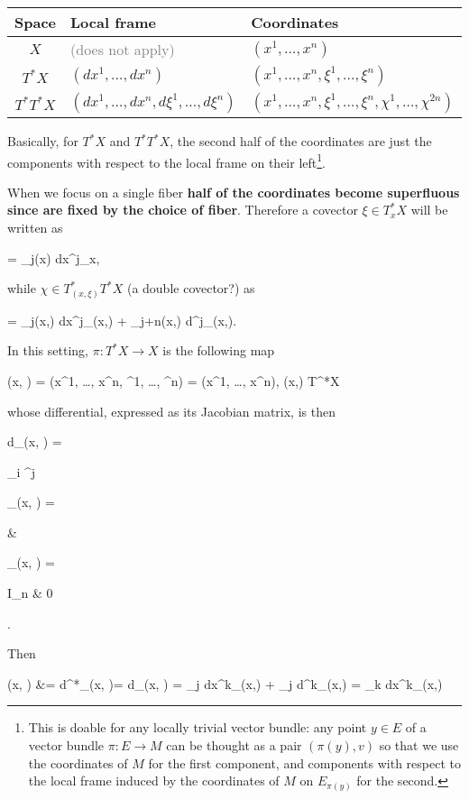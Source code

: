 \documentclass[main.tex]{subfiles}
\begin{document}
\begin{center}
	\begin{tabular}{c|l|l}
		\textbf{Space} & \textbf{Local frame} & \textbf{Coordinates}\\[1ex]
		\hline
		$X$ & \textcolor{gray}{(does not apply)} & $(x^1, \ldots, x^n)$\\[1ex]
		$T^*X$ & $(dx^1, \ldots, dx^n)$ & $(x^1, \ldots, x^n, \xi^1, \ldots, \xi^n)$\\[1ex]
		$T^*T^*X$ & $(dx^1, \ldots, dx^n, d\xi^1, \ldots, d\xi^n)$ & $(x^1, \ldots, x^n, \xi^1, \ldots, \xi^n, \chi^1, \ldots, \chi^{2n})$\\
	\end{tabular}
\end{center}

Basically, for $T^*X$ and $T^*T^*X$, the second half of the coordinates are just the components with respect to the local frame on their left\footnote{This is doable for any locally trivial vector bundle: any point $y \in E$ of a vector bundle $\pi: E \to M$ can be thought as a pair $(\pi(y), v)$ so that we use the coordinates of $M$ for the first component, and components with respect to the local frame induced by the coordinates of $M$ on $E_{\pi(y)}$ for the second.}.

When we focus on a single fiber \textbf{half of the coordinates become superfluous since are fixed by the choice of fiber}. Therefore a covector $\xi \in T^*_x X$ will be written as
\begin{eqalign}
	\xi = \xi_j(x) dx^j\vert_x,
\end{eqalign}
while $\chi \in T^*_{(x,\xi)} T^*X$ (a double covector?) as
\begin{eqalign}
	\chi = \chi_j(x,\xi) dx^j\vert_{(x,\xi)} + \chi_{j+n}(x,\xi) d\xi^j\vert_{(x,\xi)}.
\end{eqalign}

In this setting, $\pi : T^*X \to X$ is the following map
\begin{eqalign}
	\pi(x, \xi) = \pi(x^1, \ldots, x^n, \xi^1, \ldots, \xi^n) = (x^1, \ldots, x^n), \quad \forall (x,\xi) \in T^*X
\end{eqalign}
whose differential, expressed as its Jacobian matrix, is then
\begin{eqalign}
	d\pi_{(x, \xi)} = \begin{pmatrix}
		\partial_i \pi^j
	\end{pmatrix}\rvert_{(x, \xi)} = \begin{pmatrix}
		 & 
	\end{pmatrix}\rvert_{(x, \xi)} = \begin{pmatrix}
		I_n & 0
	\end{pmatrix}.
\end{eqalign}
Then
\begin{eqalign}
	\alpha(x, \xi) &= d\pi^*_{(x, \xi)}\xi = \xi \circ d\pi_{(x, \xi)} = \xi_j  dx^k\vert_{(x,\xi)} + \xi_j  d\xi^k\vert_{(x,\xi)} = \xi_k dx^k\vert_{(x,\xi)}
\end{eqalign}
\end{document}
